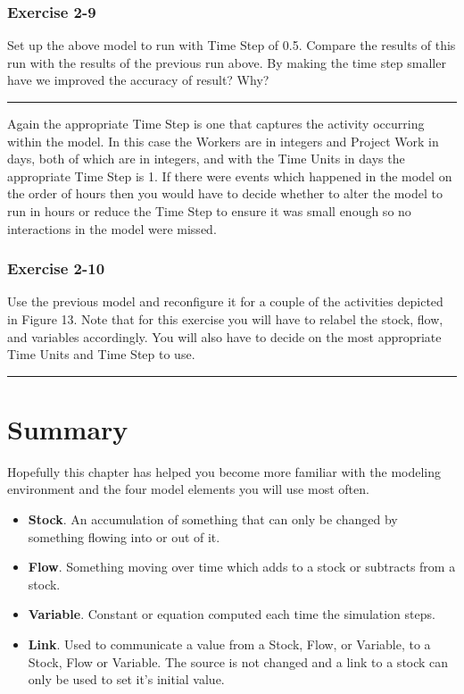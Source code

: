 \documentclass[]{memoir}
\begin{document}
\subsubsection{Exercise 2-9}

Set up the above model to run with Time Step of 0.5. Compare the results
of this run with the results of the previous run above. By making the
time step smaller have we improved the accuracy of result? Why?

\begin{center}\rule{3in}{0.4pt}\end{center}

Again the appropriate Time Step is one that captures the activity
occurring within the model. In this case the Workers are in integers and
Project Work in days, both of which are in integers, and with the Time
Units in days the appropriate Time Step is 1. If there were events which
happened in the model on the order of hours then you would have to
decide whether to alter the model to run in hours or reduce the Time
Step to ensure it was small enough so no interactions in the model were
missed.

\subsubsection{Exercise 2-10}

Use the previous model and reconfigure it for a couple of the activities
depicted in Figure 13. Note that for this exercise you will have to
relabel the stock, flow, and variables accordingly. You will also have
to decide on the most appropriate Time Units and Time Step to use.

\begin{center}\rule{3in}{0.4pt}\end{center}

\section{Summary}

Hopefully this chapter has helped you become more familiar with the
modeling environment and the four model elements you will use most
often.

\begin{itemize}
\itemsep1pt\parskip0pt
\item
  \textbf{Stock}. An accumulation of something that can only be changed
  by something flowing into or out of it.
\item
  \textbf{Flow}. Something moving over time which adds to a stock or
  subtracts from a stock.
\item
  \textbf{Variable}. Constant or equation computed each time the
  simulation steps.
\item
  \textbf{Link}. Used to communicate a value from a Stock, Flow, or
  Variable, to a Stock, Flow or Variable. The source is not changed and
  a link to a stock can only be used to set it's initial value.
\end{itemize}
\end{document}

